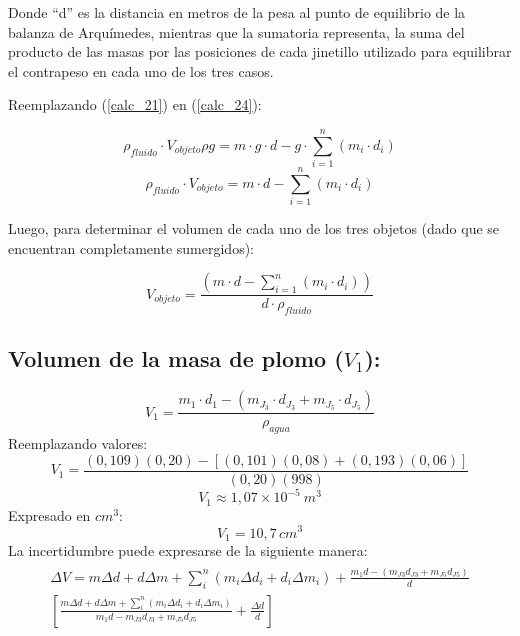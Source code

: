 \documentclass[../main.tex]{subfiles}
\begin{document}
Donde “d” es la distancia en metros de la pesa al punto de
equilibrio de la balanza de Arquímedes, mientras que la 
sumatoria representa, la suma del producto de las masas por 
las posiciones de cada jinetillo utilizado para equilibrar el 
contrapeso en cada uno de los tres casos.

Reemplazando (\ref{calc_21}) en (\ref{calc_24}):

\[\rho_{fluido}\cdot V_{objeto}\rho g=m\cdot g\cdot d-g\cdot\sum_{i=1}^n (m_i\cdot d_i ) \]
\[\rho_{fluido}\cdot V_{objeto}=m\cdot d-\sum_{i=1}^n (m_i\cdot d_i ) \]

Luego, para determinar el volumen de cada uno de los tres objetos (dado que se encuentran completamente sumergidos):

\begin{equation} \label{calc_25}
    V_{objeto}=\frac{(m\cdot d -\sum_{i=1}^n (m_i\cdot d_i ) )}{d\cdot \rho_{fluido}} 
\end{equation}

\subsection{Volumen de la masa de plomo ($V_1$):}

\[V_1=\frac{m_1\cdot d_1- (m_{J_3} \cdot d_{J_3}+m_{J_5} \cdot d_{J_5} )}{\rho_{agua}} \]
Reemplazando valores:
\[V_1=\frac{\left(0,109\right)\left(0,20\right)-\left[\left(0,101\right)\left(0,08\right)+\left(0,193\right)\left(0,06\right)\right]}{\left(0,20\right)\left(998\right)}\]
\[V_1\approx1,07\times{10}^{-5}\ m^3\]
Expresado en $cm^3$:
\[V_1=10,7\,cm^3\]
La incertidumbre puede expresarse de la siguiente manera:
\begin{align}
    \begin{split} \nonumber
        \Delta V=m\Delta d+d\Delta m
  +\sum_i^n (m_i\Delta d_i+d_i\Delta m_i) +
   \frac{m_1d-(m_{J3}d_{J3}+m_{J5}d_{J5})}{d} \\
   \left[ \frac{m\Delta d+d\Delta m+  \sum_i^n (m_i\Delta d_i+d_i\Delta m_i) }{m_1d-m_{J3}d_{J3}+m_{J5}d_{J5}} + \frac{\Delta d}{d}  \right]
    \end{split}
\end{align}
\end{document}
